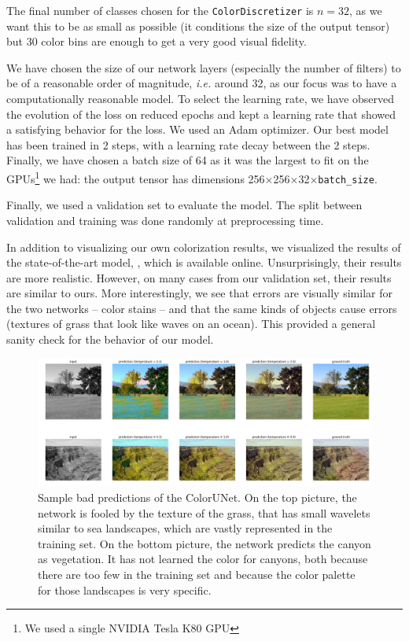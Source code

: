 \documentclass[10pt,twocolumn,letterpaper]{article}
\begin{document}
The final number of classes chosen for the \texttt{ColorDiscretizer} is $n=32$, as we want this to be as small as possible (it conditions the size of the output tensor) but 30 color bins are enough to get a very good visual fidelity.

We have chosen the size of our network layers (especially the number of filters) to be of a reasonable order of magnitude, \textit{i.e.} around 32, as our focus was to have a computationally reasonable model. To select the learning rate, we have observed the evolution of the loss on reduced epochs and kept a learning rate that showed a satisfying behavior for the loss. We used an Adam optimizer. Our best model has been trained in 2 steps, with a learning rate decay between the 2 steps. Finally, we have chosen a batch size of 64 as it was the largest to fit on the GPUs\footnote{We used a single NVIDIA Tesla K80 GPU} we had: the output tensor has dimensions 256$\times$256$\times$32$\times$\texttt{batch\_size}.

Finally, we used a validation set to evaluate the model. The split between validation and training  was done randomly at preprocessing time.

In addition to visualizing our own colorization results, we visualized the results of the state-of-the-art model, \cite{zhang2016colorful}, which is available online. Unsurprisingly, their results are more realistic. However, on many cases from our validation set, their results are similar to ours. More interestingly, we see that errors are visually similar for the two networks -- \ie color stains -- and that the same kinds of objects cause errors (\eg textures of grass that look like waves on an ocean). This provided a general sanity check for the behavior of our model.
\begin{figure}
\begin{center}
\includegraphics[width=450px]{worse}
\caption{Sample bad predictions of the ColorUNet. On the top picture, the network is fooled by the texture of the grass, that has small wavelets similar to sea landscapes, which are vastly represented in the training set. On the bottom picture, the network predicts the canyon as vegetation. It has not learned the color for canyons, both because there are too few in the training set and because the color palette for those landscapes is very specific.}
\label{worse}
\end{center}
\end{figure}
\end{document}
